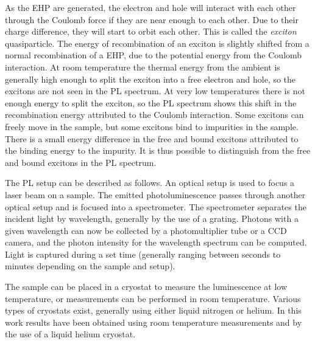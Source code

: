 As the EHP are generated, the electron and hole will interact with each other through the Coulomb force if they are near enough to each other. Due to their charge difference, they will start to orbit each other. This is called the \emph{exciton} quasiparticle. The energy of recombination of an exciton is slightly shifted from a normal recombination of a EHP, due to the potential energy from the Coulomb interaction. At room temperature the thermal energy from the ambient is generally high enough to split the exciton into a free electron and hole, so the excitons are not seen in the PL spectrum. At very low temperatures there is not enough energy to split the exciton, so the PL spectrum shows this shift in the recombination energy attributed to the Coulomb interaction. Some excitons can freely move in the sample, but some excitons bind to impurities in the sample. There is a small energy difference in the free and bound excitons attributed to the binding energy to the impurity. It is thus possible to distinguish from the free and bound excitons in the PL spectrum. 

The PL setup can be described as follows. An optical setup is used to focus a laser beam on a sample. The emitted photoluminescence passes through another optical setup and is focused into a spectrometer. The spectrometer separates the incident light by wavelength, generally by the use of a grating. Photons with a given wavelength can now be collected by a photomultiplier tube or a CCD camera, and the photon intensity for the wavelength spectrum can be computed. Light is captured during a set time (generally ranging between seconds to minutes depending on the sample and setup). 

The sample can be placed in a cryostat to measure the luminescence at low temperature, or measurements can be performed in room temperature. Various types of cryostats exist, generally using either liquid nitrogen or helium. In this work results have been obtained using room temperature measurements and by the use of a liquid helium cryostat. 






































